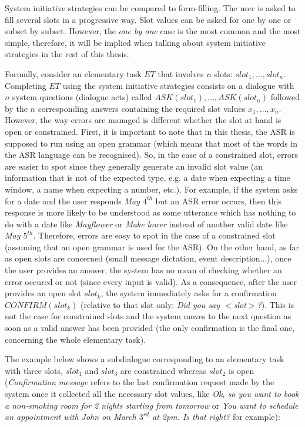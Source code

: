 		System initiative strategies can be compared to form-filling. The user is asked to fill several slots in a progressive way. Slot values can be asked for one by one or subset by subset. However, the \textit{one by one} case is the most common and the most simple, therefore, it will be implied when talking about system initiative strategies in the rest of this thesis.
		
		Formally, consider an elementary task $ET$ that involves $n$ slots: $slot_1, ..., slot_n$. Completing $ET$ using the system initiative strategies consists on a dialogue with $n$ system questions (dialogue acts) called $ASK(slot_1),...,ASK(slot_n)$ followed by the $n$ corresponding answers containing the required slot values $x_1,...,x_n$. However, the way errors are managed is different whether the slot at hand is open or constrained. First, it is important to note that in this thesis, the ASR is supposed to run using an open grammar (which means that most of the words in the ASR language can be recognised). So, in the case of a constrained slot, errors are easier to spot since they generally generate an invalid slot value (an information that is not of the expected type, e.g. a date when expecting a time window, a name when expecting a number, etc.). For example, if the system asks for a date and the user responds \textit{May $4^{th}$} but an ASR error occurs, then this response is more likely to be understood as some utterance which has nothing to do with a date like \textit{Mayflower} or \textit{Make lower} instead of another valid date like \textit{May $5^{th}$}. Therefore, errors are easy to spot in the case of a constrained slot (assuming that an open grammar is used for the ASR). On the other hand, as far as open slots are concerned (small message dictation, event description...), once the user provides an answer, the system has no mean of checking whether an error occured or not (since every input is valid). As a consequence, after the user provides an open slot $slot_k$, the system immediately asks for a confirmation $CONFIRM(slot_k)$ (relative to that slot only: \textit{Did you say $<$slot$>$?}). This is not the case for constrained slots and the system moves to the next question as soon as a valid answer has been provided (the only confirmation is the final one, concerning the whole elementary task).

                The example below shows a subdialogue corresponding to an elementary task with three slots, $slot_1$ and $slot_3$ are constrained whereas $slot_2$ is open (\textit{Confirmation message} refers to the last confirmation request made by the system once it collected all the necessary slot values, like \textit{Ok, so you want to book a non-smoking room for 2 nights starting from tomorrow} or \textit{You want to schedule an appointment with John on March $3^{rd}$ at 2pm. Is that right?} for example):
		

